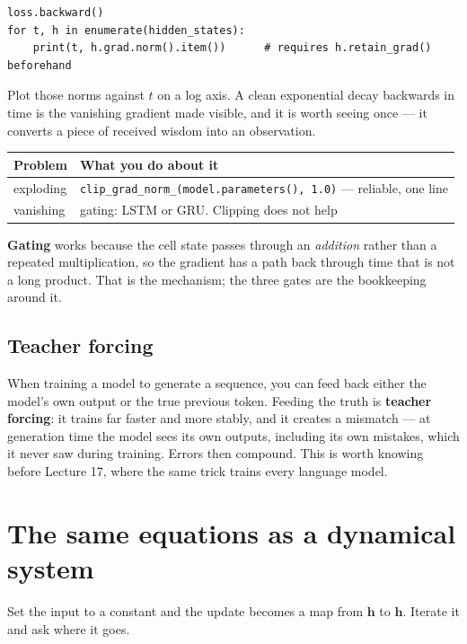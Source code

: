 \documentclass[11pt]{article}
\begin{document}
\begin{lstlisting}
loss.backward()
for t, h in enumerate(hidden_states):
    print(t, h.grad.norm().item())      # requires h.retain_grad() beforehand
\end{lstlisting}

Plot those norms against $t$ on a log axis. A clean exponential decay backwards
in time is the vanishing gradient made visible, and it is worth seeing once ---
it converts a piece of received wisdom into an observation.

\begin{center}
\begin{tabular}{@{}ll@{}}
\toprule
Problem & What you do about it \\
\midrule
exploding & \texttt{clip\_grad\_norm\_(model.parameters(), 1.0)} --- reliable, one line \\
vanishing & gating: LSTM or GRU. Clipping does not help \\
\bottomrule
\end{tabular}
\end{center}

\textbf{Gating} works because the cell state passes through an \emph{addition}
rather than a repeated multiplication, so the gradient has a path back through
time that is not a long product. That is the mechanism; the three gates are the
bookkeeping around it.

\subsection{Teacher forcing}

When training a model to generate a sequence, you can feed back either the
model's own output or the true previous token. Feeding the truth is
\textbf{teacher forcing}: it trains far faster and more stably, and it creates a
mismatch --- at generation time the model sees its own outputs, including its own
mistakes, which it never saw during training. Errors then compound. This is worth
knowing before Lecture 17, where the same trick trains every language model.

\section{The same equations as a dynamical system}

Set the input to a constant and the update becomes a map from
$\boldsymbol{h}$ to $\boldsymbol{h}$. Iterate it and ask where it goes.
\end{document}
